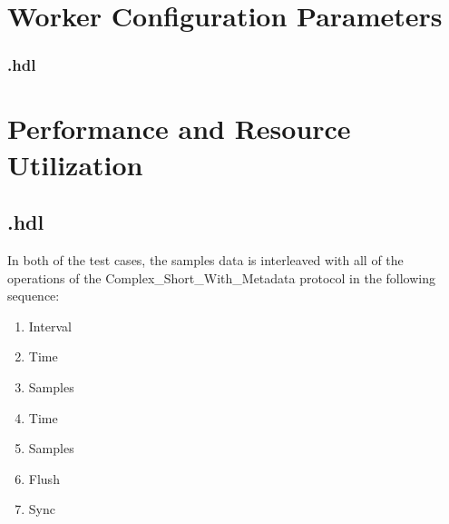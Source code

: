 \begin{landscape}
\section*{Worker Configuration Parameters}
\subsubsection*{\comp.hdl}

\section*{Performance and Resource Utilization}
\subsection*{\comp.hdl}

\end{landscape}
\newpage


\medskip
In both of the test cases, the samples data is interleaved with all of the operations of the Complex\_Short\_With\_Metadata protocol in the following sequence:

\begin{enumerate}
	\item Interval
	\item Time
	\item Samples
	\item Time	
	\item Samples
	\item Flush
	\item Sync
\end{enumerate}




